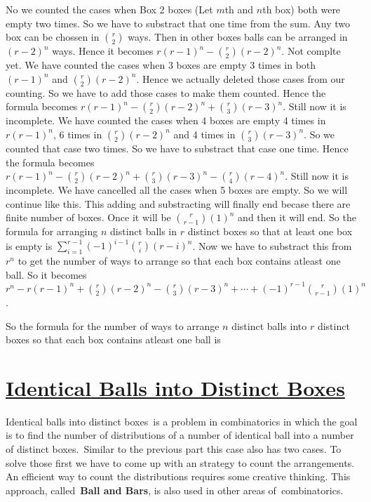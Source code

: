 \documentclass[12pt]{article}
\begin{document}
No we counted the cases when Box 2 boxes (Let $m $th and $n $th box) both were empty two times. So we have to substract that one time from the sum. Any two box can be chossen in ${{r}\choose {2}}$ ways. Then in other boxes balls can be arranged in $(r-2)^n $ ways. Hence it becomes $r (r-1)^n -{{r}\choose {2}}(r-2)^n$. Not complte yet. We have counted the cases when 3 boxes are empty 3 times in both $(r-1)^n$ and ${{r}\choose {2}}(r-2)^n$. Hence we actually deleted those cases from our counting. So we have to add those cases to make them counted. Hence the formula becomes $r (r-1)^n -{{r}\choose {2}}(r-2)^n + {{r}\choose {3}}(r-3)^n$. Still now it is incomplete. We have counted the cases when 4 boxes are empty 4 times in $r (r-1)^n$, 6 times in $ {{r}\choose {2}}(r-2)^n$ and 4 times in $ {{r}\choose {3}}(r-3)^n$. So we counted that case two times. So we have to substract that case one time. Hence the formula becomes $r (r-1)^n -{{r}\choose {2}}(r-2)^n + {{r}\choose {3}}(r-3)^n-{{r}\choose {4}}(r-4)^n$. Still now it is incomplete. We have cancelled all the cases when 5 boxes are empty. So we will continue like this. This adding and substracting will finally end becase there are finite number of boxes. Once it will be ${{r}\choose {r-1}}(1)^n$ and then it will end. So the formula for arranging $n$ distinct balls in $r $ distinct boxes so that at least one box is empty is $\sum_{i=1}^{r-1}(-1)^{i-1}{{r}\choose {i}}(r-i)^n $. Now we have to substract this from $r^n$ to get the number of ways to arrange so that each box contains atleast one ball. So it becomes $r^n-r (r-1)^n+{{r}\choose {2}}(r-2)^n-{{r}\choose {3}}(r-3)^n+\cdots +(-1)^{r-1} {{r}\choose {r-1}}(1)^n$. 

So the formula for the number of ways to arrange $n $ distinct balls into $r $ distinct boxes so that each box contains atleast one ball is 

\section{\underline{Identical Balls into Distinct Boxes}}

Identical balls into distinct boxes is a problem in combinatorics in which the goal is to find the number of distributions of a number of identical ball into a number of distinct boxes. Similar to the previous part this case also has two cases. To solve those first we have to come up with an strategy to count the arrangements. An efficient way to count the distributions requires some creative thinking. This approach, called \textbf{Ball and Bars}, is also used in other areas of combinatorics.
\end{document}
